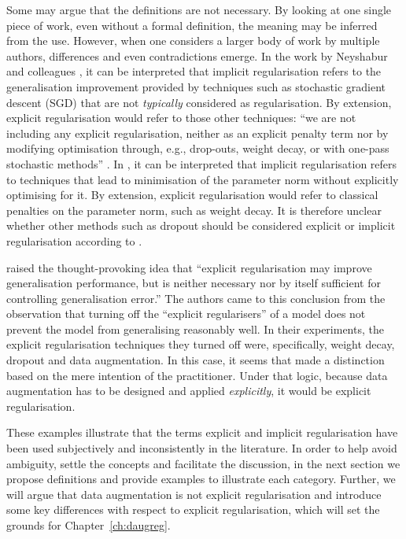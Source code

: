 {Some may argue that the definitions are not necessary. By looking at one single piece of work, even without a formal definition, the meaning may be inferred from the use. However, when one considers a larger body of work by multiple authors, differences and even contradictions emerge. In the work by Neyshabur and colleagues \citep{neyshabur2017thesis, neyshabur2014implicitreg}, it can be interpreted that implicit regularisation refers to the generalisation improvement provided by techniques such as stochastic gradient descent (SGD) that are not \textit{typically} considered as regularisation. By extension, explicit regularisation would refer to those other techniques: ``we are not including any explicit regularisation, neither as an explicit penalty term nor by modifying optimisation through, e.g., drop-outs, weight decay, or with one-pass stochastic methods'' \citep{neyshabur2017thesis}. In \citet{poggio2017theory3}, it can be interpreted that implicit regularisation refers to techniques that lead to minimisation of the parameter norm without explicitly optimising for it. By extension, explicit regularisation would refer to classical penalties on the parameter norm, such as weight decay. It is therefore unclear whether other methods such as dropout should be considered explicit or implicit regularisation according to \citet{poggio2017theory3}.

\citet{zhang2016understandingdl} raised the thought-provoking idea that ``explicit regularisation may improve generalisation performance, but is neither necessary nor by itself sufficient for controlling generalisation error.'' The authors came to this conclusion from the observation that turning off the ``explicit regularisers'' of a model does not prevent the model from generalising reasonably well. In their experiments, the explicit regularisation techniques they turned off were, specifically, weight decay, dropout and data augmentation. In this case, it seems that \citet{zhang2016understandingdl} made a distinction based on the mere intention of the practitioner. Under that logic, because data augmentation has to be designed and applied \textit{explicitly}, it would be explicit regularisation. 

These examples illustrate that the terms explicit and implicit regularisation have been used subjectively and inconsistently in the literature. In order to help avoid ambiguity, settle the concepts and facilitate the discussion, in the next section we propose definitions and provide examples to illustrate each category. Further, we will argue that data augmentation is not explicit regularisation and introduce some key differences with respect to explicit regularisation, which will set the grounds for Chapter~\ref{ch:daugreg}. 

}
